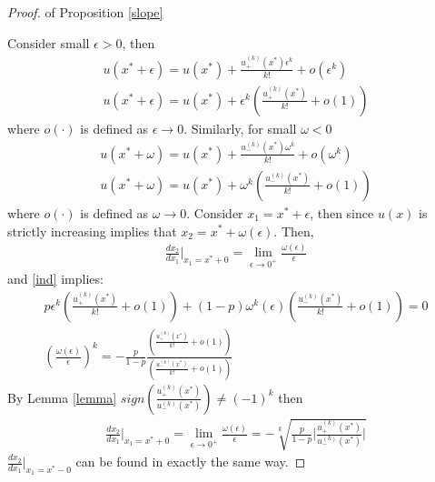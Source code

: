 \documentclass[a4paper]{article}
\newcommand{\posder}{u^{(k)}_{+}}
\newcommand{\negder}{u^{(k)}_{-}}
\begin{document}
\begin{proof} of Proposition \ref{slope}
	
	
	
	Consider small $\epsilon > 0$, then
	\begin{align*}
		u(x^* + \epsilon) = u(x^*) + \frac{u^{(k)}_{+}(x^*) \epsilon^k}{k!} + o(\epsilon^k)\\
		u(x^* + \epsilon)= u(x^*)+\epsilon^k\left( \frac{u^{(k)}_{+}(x^*)}{k!} + o(1) \right)
	\end{align*}
where $o(\cdot)$ is defined as $\epsilon \to 0$.
Similarly, for small $\omega <0$
\begin{align*}
	u(x^* + \omega) = u(x^*) + \frac{u^{(k)}_{-}(x^*) \omega^k}{k!} + o(\omega^k)\\
	u(x^* + \omega) = u(x^*) + \omega^k\left( \frac{u^{(k)}_{-}(x^*)}{k!} + o(1) \right)
\end{align*}
where $o(\cdot)$ is defined as $\omega \to 0$.
Consider $x_1 = x^*+\epsilon$, then since $u(x)$ is strictly increasing implies that $x_2 = x^* + \omega(\epsilon)$. Then,
\begin{align*}
	\frac{dx_2}{dx_1}\bigg|_{x_1=x^*+0} = \lim_{\epsilon \to 0^+} \frac{\omega(\epsilon)}{\epsilon}
\end{align*}
and \eqref{ind} implies:
\begin{align*}
		p\epsilon^k\left( \frac{u^{(k)}_{+}(x^*)}{k!} + o(1) \right) + (1-p)\omega^k(\epsilon)\left( \frac{u^{(k)}_{-}(x^*)}{k!} + o(1) \right) = 0\\
		\left(\frac{\omega(\epsilon)}{\epsilon}\right)^k = -\frac{p}{1-p} \frac{\left( \frac{u^{(k)}_{+}(x^*)}{k!} + o(1) \right)}{\left( \frac{u^{(k)}_{-}(x^*)}{k!} + o(1) \right)}
\end{align*}
By Lemma \ref{lemma} $sign\left(\frac{\posder(x^*)}{\negder(x^*)} \right) \neq (-1)^k$ then 
\begin{align*}
		\frac{dx_2}{dx_1}\bigg|_{x_1=x^*+0} = \lim_{\epsilon \to 0^+}\frac{\omega(\epsilon)}{\epsilon} = -\sqrt[k]{\frac{p}{1-p} \bigg|\frac{\posder(x^*)}{\negder(x^*)} \bigg| }
\end{align*}
$\frac{dx_2}{dx_1}\bigg|_{x_1=x^*-0}$ can be found in exactly the same way.
\end{proof}
\end{document}
